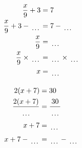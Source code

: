\documentclass[12pt]{article}
\newcounter{minipagecount}
\begin{document}
\begin{multicols}{2}
\begin{minipage}[t]{0.45\textwidth}
    \raggedright %
    \begin{align*} %
        \frac{x}{9} + 3 &= 7\\
        \frac{x}{9} + 3 - \dotuline{\hspace{5mm}} &= 7 - \dotuline{\hspace{5mm}}\\
        \frac{x}{9} &= \dotuline{\hspace{5mm}}\\
        \frac{x}{9} \times\dotuline{\hspace{5mm}} &= \dotuline{\hspace{5mm}} \times\dotuline{\hspace{5mm}}\\
        x &= \dotuline{\hspace{5mm}}\\
    \end{align*}
\end{minipage} %
\noindent{(\theminipagecount)}\hspace{0.1mm} %
\begin{minipage}[t]{0.45\textwidth} %
    \vspace{-26pt}  %
    \raggedright %
    \begin{align*} %
        2(x + 7) &= 30\\
        \frac{2(x+7)}{\dotuline{\hspace{5mm}}} &= \frac{30}{\dotuline{\hspace{5mm}}}\\
        x + 7 &= \dotuline{\hspace{5mm}}\\
        x + 7 - \dotuline{\hspace{5mm}} &= \dotuline{\hspace{5mm}} - \dotuline{\hspace{5mm}}\\

\end{align*}
\end{minipage}
\end{multicols}
\end{document}
